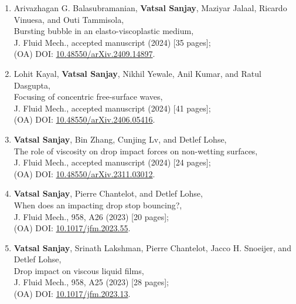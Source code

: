 \documentclass[11pt,a4paper,roman,english,colorlinks,linkcolor={red!50!black}]{moderncv}
\begin{document}
\begin{enumerate}[leftmargin=0.75cm]
	\item Arivazhagan G. Balasubramanian, \textbf{Vatsal Sanjay}, Maziyar Jalaal, Ricardo Vinuesa, and Outi Tammisola,\\
	Bursting bubble in an elasto-viscoplastic medium,\\
	J. Fluid Mech., accepted manuscript (2024) [35 pages];\\
	(OA) DOI: \href{https://doi.org/10.48550/arXiv.2409.14897}{10.48550/arXiv.2409.14897}.

	\item Lohit Kayal, \textbf{Vatsal Sanjay}, Nikhil Yewale, Anil Kumar, and Ratul Dasgupta,\\
	Focusing of concentric free-surface waves,\\
	J. Fluid Mech., accepted manuscript (2024) [41 pages];\\
	(OA) DOI: \href{https://doi.org/10.48550/arXiv.2406.05416}{10.48550/arXiv.2406.05416}.

	\item \textbf{Vatsal Sanjay}, Bin Zhang, Cunjing Lv, and Detlef Lohse,\\
	The role of viscosity on drop impact forces on non-wetting surfaces,\\
	J. Fluid Mech., accepted manuscript (2024) [24 pages];\\
	(OA) DOI: \href{https://doi.org/10.48550/arXiv.2311.03012}{10.48550/arXiv.2311.03012}.

	\item \textbf{Vatsal Sanjay}, Pierre Chantelot, and Detlef Lohse,\\
	When does an impacting drop stop bouncing?,\\
	J. Fluid Mech., 958, A26 (2023) [20 pages];\\
	(OA) DOI: \href{https://doi.org/10.1017/jfm.2023.55}{10.1017/jfm.2023.55}.

	\item \textbf{Vatsal Sanjay}, Srinath Lakshman, Pierre Chantelot, Jacco H. Snoeijer, and Detlef Lohse,\\
	Drop impact on viscous liquid films,\\
	J. Fluid Mech., 958, A25 (2023) [28 pages];\\
	(OA) DOI: \href{https://doi.org/10.1017/jfm.2023.13}{10.1017/jfm.2023.13}.


\end{enumerate}
\end{document}
